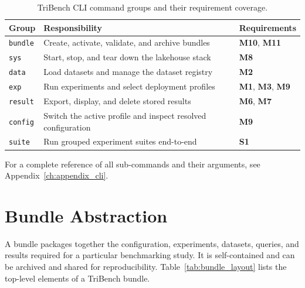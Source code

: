 \documentclass{l4proj}
\begin{document}
\begin{table}[H]
\centering
\begin{tabular}{lp{7.5cm}l}
\hline
\textbf{Group} & \textbf{Responsibility} & \textbf{Requirements} \\
\hline
\texttt{bundle} & Create, activate, validate, and archive bundles & \textbf{M10}, \textbf{M11} \\
\texttt{sys}    & Start, stop, and tear down the lakehouse stack & \textbf{M8} \\
\texttt{data}   & Load datasets and manage the dataset registry & \textbf{M2} \\
\texttt{exp}    & Run experiments and select deployment profiles & \textbf{M1}, \textbf{M3}, \textbf{M9} \\
\texttt{result} & Export, display, and delete stored results & \textbf{M6}, \textbf{M7} \\
\texttt{config} & Switch the active profile and inspect resolved configuration & \textbf{M9} \\
\texttt{suite}  & Run grouped experiment suites end-to-end & \textbf{S1} \\
\hline
\end{tabular}
\caption{TriBench CLI command groups and their requirement coverage.}
\label{tab:cli_groups}
\end{table}

For a complete reference of all sub-commands and their arguments, see Appendix~\ref{ch:appendix_cli}.

\section{Bundle Abstraction}
\label{sec:bundle_design}

A bundle packages together the configuration, experiments, datasets, queries, and results required for a particular benchmarking study. It is self-contained and can be archived and shared for reproducibility. Table~\ref{tab:bundle_layout} lists the top-level elements of a TriBench bundle.
\end{document}
